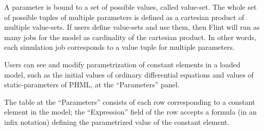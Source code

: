 \documentclass[a4paper,10pt]{report}
\begin{document}
A parameter is bound to a set of possible values, called value-set.
The whole set of possible tuples of multiple parameters is defined as a
cartesian product of multiple value-sets.
If users define value-sets and use them, then Flint will run as many jobs
for the model as cardinality of the cartesian product. In other words,
each simulation job corresponds to a value tuple for multiple parameters.

Users can see and modify parametrization of constant elements in a loaded model,
such as the initial values of ordinary differential equations and values of
static-parameters of PHML, at the ``Parameters'' panel.

The table at the ``Parameters'' consists of each row corresponding to a constant
element in the model; the ``Expression'' field of the row accepts a formula
(in an infix notation) defining the parametrized value of the constant element.
\end{document}
